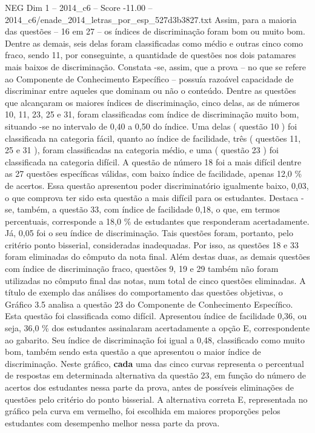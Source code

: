 \begin{textsample}{NEG Dim 1 – 2014\_c6 – Score -11.00 – 2014\_c6/enade\_2014\_letras\_por\_esp\_527d3b3827.txt}
Assim, para a maioria das questões – 16 em 27 – os índices de discriminação foram bom ou muito bom.
Dentre as demais, seis delas foram classificadas como médio e outras cinco como fraco, sendo 11, por conseguinte, a quantidade de questões nos dois patamares mais baixos de discriminação.
Constata -se, assim, que a prova – no que se refere ao Componente de Conhecimento Específico – possuía razoável capacidade de discriminar entre aqueles que dominam ou não o conteúdo.
Dentre as questões que alcançaram os maiores índices de discriminação, cinco delas, as de números 10, 11, 23, 25 e 31, foram classificadas com índice de discriminação muito bom, situando -se no intervalo de 0,40 a 0,50 do índice.
Uma delas ( questão 10 ) foi classificada na categoria fácil, quanto ao índice de facilidade, três ( questões 11, 25 e 31 ), foram classificadas na categoria médio, e uma ( questão 23 ) foi classificada na categoria difícil.
A questão de número 18 foi a mais difícil dentre as 27 questões específicas válidas, com baixo índice de facilidade, apenas 12,0 \% de acertos.
Essa questão apresentou poder discriminatório igualmente baixo, 0,03, o que comprova ter sido esta questão a mais difícil para os estudantes.
Destaca -se, também, a questão 33, com índice de facilidade 0,18, o que, em termos percentuais, corresponde a 18,0 \% de estudantes que responderam acertadamente.
Já, 0,05 foi o seu índice de discriminação.
Tais questões foram, portanto, pelo critério ponto bisserial, consideradas inadequadas.
Por isso, as questões 18 e 33 foram eliminadas do cômputo da nota final.
Além destas duas, as demais questões com índice de discriminação fraco, questões 9, 19 e 29 também não foram utilizadas no cômputo final das notas, num total de cinco questões eliminadas.
A título de exemplo das análises do comportamento das questões objetivas, o Gráfico 3.5 analisa a questão 23 do Componente de Conhecimento Específico.
Esta questão foi classificada como difícil.
Apresentou índice de facilidade 0,36, ou seja, 36,0 \% dos estudantes assinalaram acertadamente a opção E, correspondente ao gabarito.
Seu índice de discriminação foi igual a 0,48, classificado como muito bom, também sendo esta questão a que apresentou o maior índice de discriminação.
Neste gráfico, \textbf{cada} uma das cinco curvas representa o percentual de respostas em determinada alternativa da questão 23, em função do número de acertos dos estudantes nessa parte da prova, antes de possíveis eliminações de questões pelo critério do ponto bisserial.
A alternativa correta E, representada no gráfico pela curva em vermelho, foi escolhida em maiores proporções pelos estudantes com desempenho melhor nessa parte da prova.

\end{textsample}
